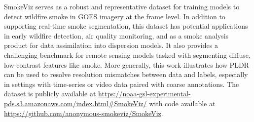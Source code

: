 \documentclass{article}
\begin{document}
SmokeViz serves as a robust and representative dataset for training models to detect wildfire smoke in GOES imagery at the frame level. In addition to supporting real-time smoke segmentation, this dataset has potential applications in early wildfire detection, air quality monitoring, and as a smoke analysis product for data assimilation into dispersion models. It also provides a challenging benchmark for remote sensing models tasked with segmenting diffuse, low-contrast features like smoke. More generally, this work illustrates how PLDR can be used to resolve resolution mismatches between data and labels, especially in settings with time-series or video data paired with coarse annotations. The dataset is publicly available at \url{https://noaa-gsl-experimental-pds.s3.amazonaws.com/index.html#SmokeViz/} with code available at \url{https://github.com/anonymous-smokeviz/SmokeViz}. 





\end{document}
